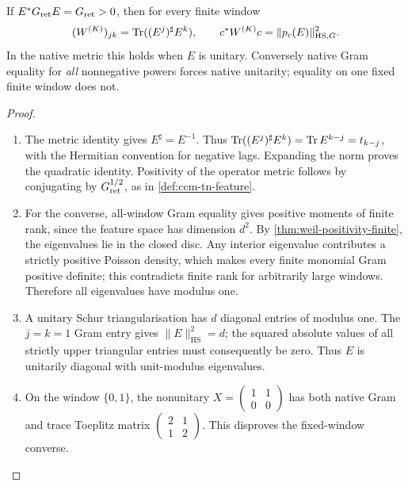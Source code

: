 \begin{proposition}
\label{prop:ccm-tn-operator-gram}
If $E^*G_{\mathrm{ret}} E=G_{\mathrm{ret}}>0$, then for every finite window
\[
 (W^{(K)})_{jk}=\operatorname{Tr}((E^j)^\sharp E^k),\qquad
 c^*W^{(K)} c=\|p_c(E)\|_{\mathrm{HS},G}^2.
\]
In the native metric this holds when $E$ is unitary. Conversely native
Gram equality for \emph{all} nonnegative powers forces native unitarity;
equality on one fixed finite window does not.
\end{proposition}
\begin{proof}
\begin{enumerate}
\item[$\langle1\rangle$1.] The metric identity gives $E^\sharp=E^{-1}$.
Thus $\operatorname{Tr}((E^j)^\sharp E^k)=\operatorname{Tr} E^{k-j}=t_{k-j}$, with the
Hermitian convention for negative lags. Expanding the norm proves the
quadratic identity. Positivity of the operator metric follows by
conjugating by $G_{\mathrm{ret}}^{1/2}$, as in \cref{def:ccm-tn-feature}.
\item[$\langle1\rangle$2.] For the converse, all-window Gram equality
gives positive moments of finite rank, since the feature space has
dimension $d^2$. By \cref{thm:weil-positivity-finite}, the eigenvalues
lie in the closed disc. Any interior eigenvalue contributes a strictly
positive Poisson density, which makes every finite monomial Gram
positive definite; this contradicts finite rank for arbitrarily large
windows. Therefore all eigenvalues have modulus one.
\item[$\langle1\rangle$3.] A unitary Schur triangularisation has
$d$ diagonal entries of modulus one. The $j=k=1$ Gram entry gives
$\|E\|_{\mathrm{HS}}^2=d$; the squared absolute values of all
strictly upper triangular entries must consequently be zero. Thus $E$
is unitarily diagonal with unit-modulus eigenvalues.
\item[$\langle1\rangle$4.] On the window $\{0,1\}$, the nonunitary
$X=\left(\begin{smallmatrix}1&1\\0&0\end{smallmatrix}\right)$ has
both native Gram and trace Toeplitz matrix
$\left(\begin{smallmatrix}2&1\\1&2\end{smallmatrix}\right)$.
This disproves the fixed-window converse.
\end{enumerate}
\end{proof}

